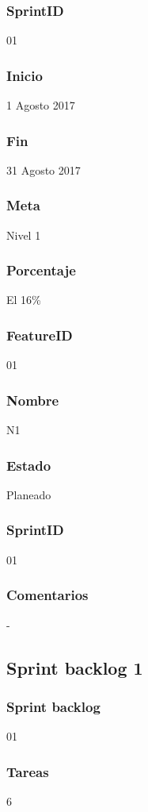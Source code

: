 \subsubsection{SprintID}
01
\subsubsection{Inicio}
1 Agosto 2017
\subsubsection{Fin}
31 Agosto 2017
\subsubsection{Meta}
Nivel 1
\subsubsection{Porcentaje}
El 16\% 


\subsubsection{FeatureID}
01
\subsubsection{Nombre}
N1
\subsubsection{Estado}
Planeado

\subsubsection{SprintID}
01
\subsubsection{Comentarios}
-


\subsection{Sprint backlog 1}
\subsubsection{Sprint backlog}
01

\subsubsection{Tareas}
6
